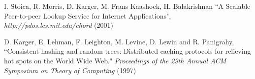 \documentclass{sig-alternate-10pt}
\begin{document}
%
\vspace{-0.1cm}

\begin{thebibliography}{00}
\vspace{-0.1cm}

I. Stoica, R. Morris, D. Karger, M. Frans Kaashoek, H. Balakrishnan
``A Scalable Peer-to-peer Lookup Service for Internet Applications",
{\em http://pdos.lcs.mit.edu/chord} (2001)

D. Karger, E. Lehman, F. Leighton, M. Levine, D. Lewin and R. Panigrahy,
``Consistent hashing and random trees: Distributed caching protocols for relieving hot spots on the World Wide Web."
{\em Proceedings of the 29th Annual ACM Symposium on Theory of Computing} (1997)

%
%
\end{thebibliography}
\end{document}
